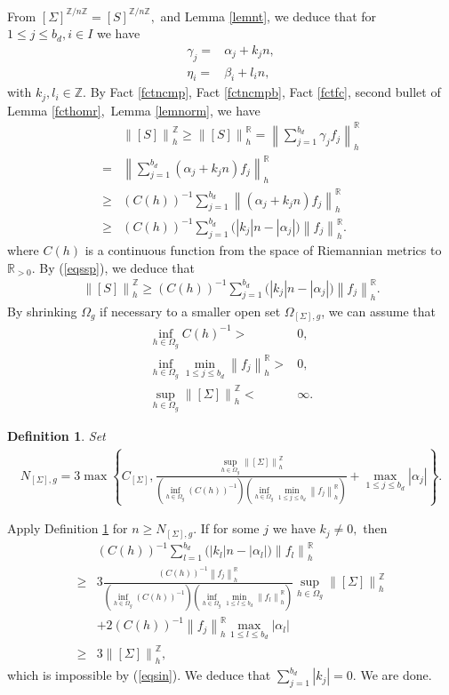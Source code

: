 \documentclass[11pt,a4paper]{amsart}
\numberwithin{equation}{section}
\newcommand{\ai}{\alpha}
\newcommand{\be}{\beta}
\newcommand{\ga}{\gamma}
\newcommand{\Om}{\Omega}
\newcommand{\Si}{\Sigma}
\newcommand{\nog}[1]{\no{#1}^{\R}}
\newcommand{\no}[1]{\left\lVert#1\right\rVert}
\newcommand{\m}{^{-1}}
\newcommand{\R}{\mathbb{R}}
\newcommand{\Z}{\mathbb{Z}}
\theoremstyle{plain}
\newtheorem{defn}{Definition}[subsection]
\theoremstyle{definition}
\numberwithin{equation}{subsection}
\begin{document}
From $[\Si]^{\Z/n\Z}=[S]^{\Z/n\Z},$ and Lemma \ref{lemnt}, we deduce that for $1\le j\le b_d,i\in I$ we have
\begin{align*}
	\ga_j=&\ai_j+k_jn,\\
	\eta_i=&\be_i+l_in,
\end{align*}with $k_j,l_i\in\Z.$
By Fact \ref{fctncmp}, Fact \ref{fctncmpb}, Fact \ref{fctfc}, second bullet of Lemma \ref{fcthomr}, Lemma \ref{lemnorm}, we have
\begin{align*}
	&\no{[S]}_h^{\Z}\ge\no{[S]}_h^{\R}
	=\no{\sum_{j=1}^{b_d}\ga_jf_j}^{\R}_h\\
	=&\no{\sum_{j=1}^{b_d}(\ai_j+k_jn)f_j}^{\R}_h\\
	\ge&(C(h))\m\sum_{j=1}^{b_d}\nog{(\ai_j+k_jn)f_j}_h\\
	\ge&(C(h))\m \sum_{j=1}^{b_d}\big(|k_j|n-|\ai_j|\big)\nog{f_j}_h.
\end{align*}where $C(h)$ is a continuous function from the space of Riemannian metrics to $\R_{>0}$. By (\ref{eqssp}), we deduce that
\begin{align}\label{eqsin}
	\no{[S]}_h^{\Z}\ge (C(h))\m \sum_{j=1}^{b_d}\big(|k_j|n-|\ai_j|\big)\nog{f_j}_h.
\end{align}
By shrinking $\Om_g$ if necessary to a smaller open set $\Om_{[\Si],g}$, we can assume that
\begin{align*}
	\inf_{h\in \Om_g}C(h)\m>&0,\\\inf_{h\in\Om_g}\min_{1\le j\le b_d}\nog{f_j}_h>&0,\\
	\sup_{h\in \Om_g}\no{[\Si]}^{\Z}_h<&\infty.
\end{align*}
\begin{defn}\label{defnnsg}
	Set 
	\begin{align*}
		N_{[\Si],g}=3\max\left\{C_{[\Si]},\frac{	\sup_{h\in \Om_g}\no{[\Si]}^{\Z}_h}{\left(\inf_{h\in \Om_g}(C(h))\m\right)\left(\inf_{h\in\Om_g}\min_{1\le j\le b_d}\nog{f_j}_h\right)}+\max_{1\le j\le b_d}|\ai_j|\right\}.
	\end{align*}
\end{defn}
Apply Definition \ref{defnnsg} for $n\ge N_{[\Si],g}$. If for some $j$ we have $k_j\not=0,$ then
\begin{align*}
	&(C(h))\m \sum_{l=1}^{b_d}\big(|k_l|n-|\ai_l|\big)\nog{f_l}_h\\	\ge &3\frac{(C(h))\m\nog{f_j}_h	}{\left(\inf_{h\in \Om_g}(C(h))\m\right)\left(\inf_{h\in\Om_g}\min_{1\le l\le b_d}\nog{f_l}_h\right)}\sup_{h\in \Om_g}\no{[\Si]}^{\Z}_h\\&+2(C(h))\m\nog{f_j}_h	\max_{1\le l\le b_d}|\ai_l|\\
	\ge&3 \no{[\Si]}^{\Z}_h,
\end{align*} which is impossible by (\ref{eqsin}). We deduce that $\sum_{j=1}^{b_d}|k_j|=0.$ We are done.
\end{document}
